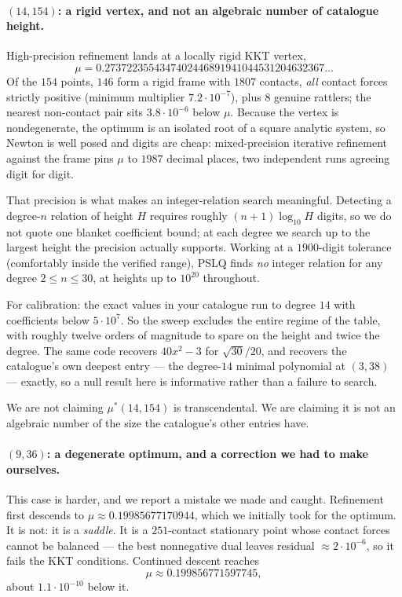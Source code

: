 \documentclass[11pt,a4paper]{article}
\newcommand{\mustar}{\mu^{*}}
\begin{document}
\paragraph{$(14,154)$: a rigid vertex, and not an algebraic number of catalogue height.}
High-precision refinement lands at a locally rigid KKT vertex,
\[
\mu = 0.2737223554347402446891941044531204632367\ldots
\]
Of the $154$ points, $146$ form a rigid frame with $1807$ contacts, \emph{all} contact
forces strictly positive (minimum multiplier $7.2\cdot10^{-7}$), plus $8$ genuine
rattlers; the nearest non-contact pair sits $3.8\cdot10^{-6}$ below $\mu$. Because the
vertex is nondegenerate, the optimum is an isolated root of a square analytic system,
so Newton is well posed and digits are cheap: mixed-precision iterative refinement
against the frame pins $\mu$ to $1987$ decimal places, two independent runs agreeing
digit for digit.

That precision is what makes an integer-relation search meaningful. Detecting a
degree-$n$ relation of height $H$ requires roughly $(n+1)\log_{10}H$ digits, so we do
not quote one blanket coefficient bound; at each degree we search up to the largest
height the precision actually supports. Working at a $1900$-digit tolerance (comfortably
inside the verified range), PSLQ finds \emph{no} integer relation for any degree
$2 \le n \le 30$, at heights up to $10^{20}$ throughout.

For calibration: the exact values in your catalogue run to degree $14$ with
coefficients below $5\cdot10^{7}$. So the sweep excludes the entire regime of the
table, with roughly twelve orders of magnitude to spare on the height and twice the
degree. The same code recovers $40x^2-3$ for $\sqrt{30}/20$, and recovers the
catalogue's own deepest entry --- the degree-$14$ minimal polynomial at $(3,38)$ ---
exactly, so a null result here is informative rather than a failure to search.

We are not claiming $\mustar(14,154)$ is transcendental. We are claiming it is not an
algebraic number of the size the catalogue's other entries have.

\paragraph{$(9,36)$: a degenerate optimum, and a correction we had to make ourselves.}
This case is harder, and we report a mistake we made and caught. Refinement first
descends to $\mu \approx 0.19985677170944$, which we initially took for the optimum.
It is not: it is a \emph{saddle}. It is a $251$-contact stationary point whose contact
forces cannot be balanced --- the best nonnegative dual leaves residual
$\approx 2\cdot10^{-6}$, so it fails the KKT conditions. Continued descent reaches
\[
\mu \approx 0.199856771597745,
\]
about $1.1\cdot10^{-10}$ below it.
\end{document}
